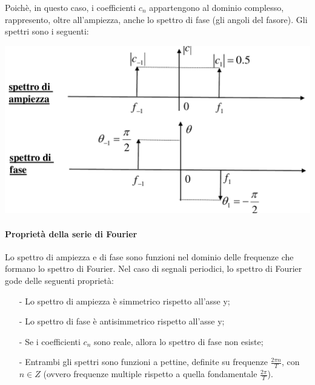 \documentclass[a4paper, 10pt]{report}
\begin{document}
\noindent Poichè, in questo caso, i coefficienti $c_n$ appartengono al dominio complesso, rappresento, oltre all'ampiezza, anche lo spettro di fase (gli angoli del fasore). 
\newpage
\noindent Gli spettri sono i seguenti:
\begin{center}
\includegraphics[scale=0.4]{10.pdf}
\end{center}

\paragraph*{Proprietà della serie di Fourier} Lo spettro di ampiezza e di fase sono funzioni nel dominio delle frequenze che formano lo spettro di Fourier. Nel caso di segnali periodici, lo spettro di Fourier gode delle seguenti proprietà:
\begin{itemize}
\item[-] Lo spettro di ampiezza è simmetrico rispetto all'asse y;
\item[-] Lo spettro di fase è antisimmetrico rispetto all'asse y;
\item[-] Se i coefficienti $c_n$ sono reale, allora lo spettro di fase non esiste;
\item[-] Entrambi gli spettri sono funzioni a pettine, definite su frequenze $\frac{2 \pi  n}{T}$, con $n \in Z$ (ovvero frequenze multiple rispetto a quella fondamentale $\frac{2 \pi}{T}$).
\end{itemize}
\end{document}
